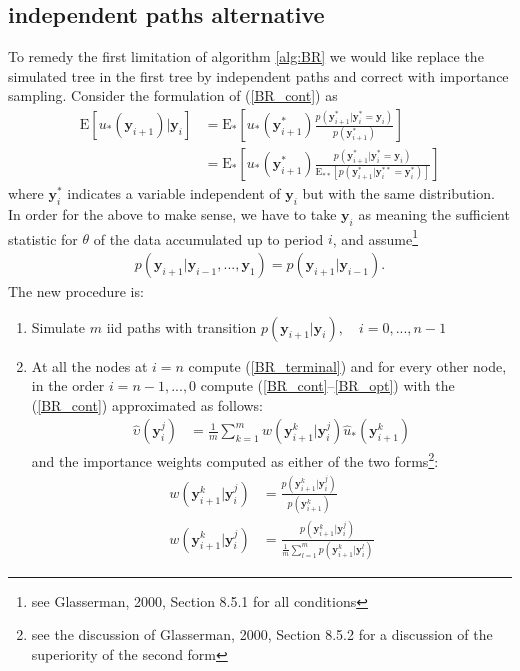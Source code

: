 \documentclass{article}
\begin{document}
\subsection{independent paths alternative}
To remedy the first limitation of algorithm \ref{alg:BR} we would
like replace the simulated tree in the first tree by independent
paths and correct with importance sampling. Consider the formulation
of (\ref{BR_cont}) as
\begin{eqnarray}\label{BR_cont_alt_1}
\mathrm{E}[u_{*}(\mathbf{y}_{i+1})|\mathbf{y}_{i}]
&=\mathrm{E}_*[u_{*}(\mathbf{y}_{i+1}^*)\frac{p(\mathbf{y}_{i+1}^*|\mathbf{y}_{i}^*=\mathbf{y}_{i})}{p(\mathbf{y}_{i+1}^*)}]\\\label{BR_cont_alt_2}&=
\mathrm{E}_*[u_{*}(\mathbf{y}_{i+1}^*)\frac{p(\mathbf{y}_{i+1}^*|\mathbf{y}_i^*=\mathbf{y}_i)}{\mathrm{E}_{**}[p(\mathbf{y}_{i+1}^*|\mathbf{y}_{i}^{**}=\mathbf{y}_{i}^*)]}]
\end{eqnarray}where $\mathbf{y}_i^*$ indicates a variable
independent of $\mathbf{y}_i$ but with the same distribution. In
order for the above to make sense, we have to take $\mathbf{y}_i$ as
meaning the sufficient statistic for $\theta$ of the data
accumulated up to period $i$, and assume\footnote{see Glasserman,
2000, Section 8.5.1 for all conditions}
\begin{align}\label{mesh_cond_1}p(\mathbf{y}_{i+1}|\mathbf{y}_{i-1},...,\mathbf{y}_{1})=p(\mathbf{y}_{i+1}|\mathbf{y}_{i-1}).\end{align}
The new procedure is:
\begin{algorithm}[BR--IS]\label{alg:BR_IS}
\hfill\par
\begin{enumerate}
\item Simulate $m$ iid paths with transition
$p(\mathbf{y}_{i+1}|\mathbf{y}_{i}), \quad i=0,...,n-1$
\item At all the nodes at $i=n$ compute
(\ref{BR_terminal}) and for every other node, in the order
$i=n-1,...,0$ compute (\ref{BR_cont}--\ref{BR_opt}) with the
(\ref{BR_cont}) approximated as follows:
\begin{align}\label{BR_IS_est_upsilon}
\hat\upsilon(\mathbf{y}_i^{j})&=\frac{1}{m} \sum_{k=1}^m
w(\mathbf{y}_{i+1}^k|\mathbf{y}_{i}^j)\hat u_*(\mathbf{y}_{i+1}^{k})
\end{align}and the importance weights computed as either of the two
forms\footnote{see the discussion of Glasserman, 2000, Section 8.5.2
for a discussion of the superiority of the second form}:
\begin{align}
w(\mathbf{y}_{i+1}^k|\mathbf{y}_{i}^j)&=\frac{p(\mathbf{y}_{i+1}^k|\mathbf{y}_{i}^j)}{p(\mathbf{y}_{i+1}^k)}\\
w(\mathbf{y}_{i+1}^k|\mathbf{y}_{i}^j)&=\frac{p(\mathbf{y}_{i+1}^k|\mathbf{y}_{i}^j)}{\frac{1}{m}\sum_{l=1}^m
p(\mathbf{y}_{i+1}^k|\mathbf{y}_{i}^l)}
\end{align}
\end{enumerate}
\end{algorithm}
\end{document}
